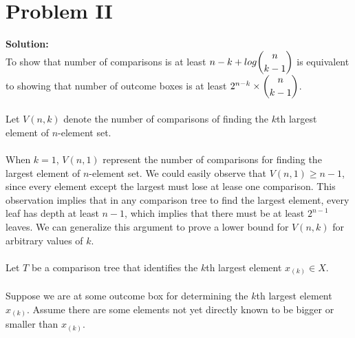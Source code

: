 \section{Problem II}

\textbf{Solution:} \\
To show that number of comparisons is at least $n - k + log\dbinom{n}{k - 1}$ is equivalent to showing that number of outcome boxes is at least $2^{n - k} \times \dbinom{n}{k - 1}$.\\\\

Let $V(n, k)$ denote the number of comparisons of finding the $k$th largest element of $n$-element set. \\\\

When $k = 1$, $V(n, 1)$ represent the number of comparisons for finding the largest element of $n$-element set. We could easily observe that $V(n, 1) \geq n - 1$, since every element except the largest must lose at lease one comparison. This observation implies that in any comparison tree to find the largest element, every leaf has depth at least $n - 1$, which implies that there must be at least $2^{n - 1}$ leaves. We can generalize this argument to prove a lower bound for $V(n, k)$ for arbitrary values of $k$.\\\\

Let $T$ be a comparison tree that identifies the $k$th largest element $x_{(k)} \in X$.\\\\

Suppose we are at some outcome box for determining the $k$th largest element $x_{(k)}$. Assume there are some elements not yet directly known to be bigger or smaller than $x_{(k)}$. \\

